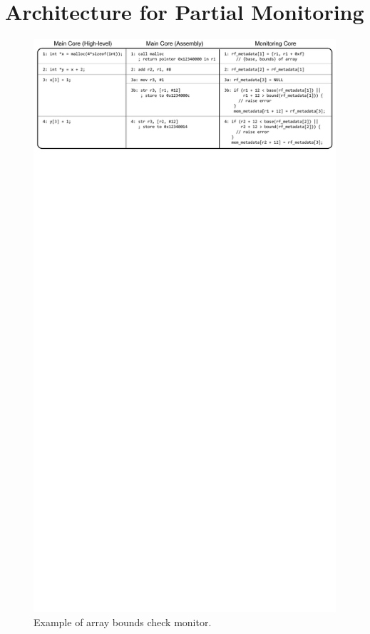 \section{Architecture for Partial Monitoring}
\label{sec:monitoring_dift_drop.dropping}

\begin{figure}
  \begin{center}
    \includegraphics{figs/example_full.pdf}
    \caption{Example of array bounds check monitor.}
    \label{fig:monitoring_dift_drop.dropping.example_full}
  \end{center}
\end{figure} 

